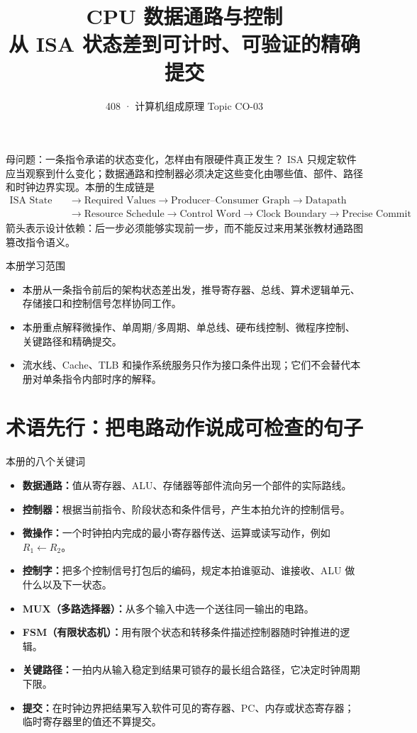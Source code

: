 \documentclass[UTF8,fontset=fandol,11pt,a4paper]{ctexart}
\title{\vspace{-1.1cm}\textbf{CPU 数据通路与控制}\\[0.4em]
\large 从 ISA 状态差到可计时、可验证的精确提交}
\author{408 · 计算机组成原理 Topic CO-03}
\date{}
\newcommand{\kw}[1]{\textbf{\color{deep}#1}}
\begin{document}
\maketitle

\begin{corebox}{母问题：一条指令承诺的状态变化，怎样由有限硬件真正发生？}
ISA 只规定软件应当观察到什么变化；数据通路和控制器必须决定这些变化由哪些值、部件、路径和时钟边界实现。本册的生成链是
\[
\boxed{\begin{aligned}
\text{ISA State Delta}&\to\text{Required Values}\to\text{Producer--Consumer Graph}\to\text{Datapath}\\
&\to\text{Resource Schedule}\to\text{Control Word}\to\text{Clock Boundary}\to\text{Precise Commit}
\end{aligned}}
\]
箭头表示设计依赖：后一步必须能够实现前一步，而不能反过来用某张教材通路图篡改指令语义。
\end{corebox}

\begin{methodbox}{本册学习范围}
\begin{itemize}
  \item 本册从一条指令前后的架构状态差出发，推导寄存器、总线、算术逻辑单元、存储接口和控制信号怎样协同工作。
  \item 本册重点解释微操作、单周期/多周期、单总线、硬布线控制、微程序控制、关键路径和精确提交。
  \item 流水线、Cache、TLB 和操作系统服务只作为接口条件出现；它们不会替代本册对单条指令内部时序的解释。
\end{itemize}
\end{methodbox}

\section{术语先行：把电路动作说成可检查的句子}
\begin{methodbox}{本册的八个关键词}
\begin{itemize}
  \item \kw{数据通路：}值从寄存器、ALU、存储器等部件流向另一个部件的实际路线。
  \item \kw{控制器：}根据当前指令、阶段状态和条件信号，产生本拍允许的控制信号。
  \item \kw{微操作：}一个时钟拍内完成的最小寄存器传送、运算或读写动作，例如 $R_1\leftarrow R_2$。
  \item \kw{控制字：}把多个控制信号打包后的编码，规定本拍谁驱动、谁接收、ALU 做什么以及下一状态。
  \item \kw{MUX（多路选择器）：}从多个输入中选一个送往同一输出的电路。
  \item \kw{FSM（有限状态机）：}用有限个状态和转移条件描述控制器随时钟推进的逻辑。
  \item \kw{关键路径：}一拍内从输入稳定到结果可锁存的最长组合路径，它决定时钟周期下限。
  \item \kw{提交：}在时钟边界把结果写入软件可见的寄存器、PC、内存或状态寄存器；临时寄存器里的值还不算提交。
\end{itemize}
\end{methodbox}
\end{document}
